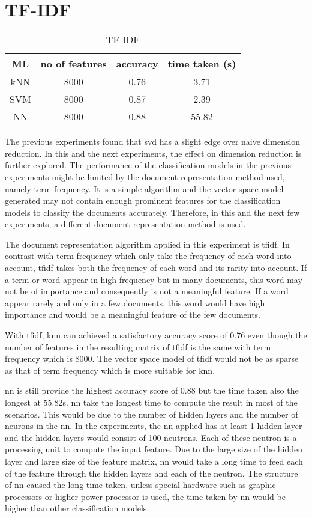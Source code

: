 \section{TF-IDF}
\begin{table} [H]
	\centering
	\caption{TF-IDF}
	\label{tbl:tfidf}
	\begin{tabular}{|| c | c | c | c||}
		\hline
		ML & no of features & accuracy & time taken (s) \\ [0.5ex]
		\hline\hline
		kNN & 8000 & 0.76 & 3.71 \\ 
		\hline
		SVM & 8000 & 0.87 & 2.39 \\
		\hline
		NN & 8000 & 0.88 & 55.82 \\
		\hline
	\end{tabular}
\end{table}

The previous experiments found that \ac{svd} has a slight edge over naive dimension reduction. In this and the next experiments, the effect on dimension reduction is further explored. The performance of the classification models in the previous experiments might be limited by the document representation method used, namely term frequency. It is a simple algorithm and the vector space model generated may not contain enough prominent features for the classification models to classify the documents accurately. Therefore, in this and the next few experiments, a different document representation method is used.
 
The document representation algorithm applied in this experiment is \ac{tfidf}. In contrast with term frequency which only take the frequency of each word into account, \ac{tfidf} takes both the frequency of each word and its rarity into account. If a term or word appear in high frequency but in many documents, this word may not be of importance and consequently is not a meaningful feature. If a word appear rarely and only in a few documents, this word would have high importance and would be a meaningful feature of the few documents.

With \ac{tfidf}, \ac{knn} can achieved a satisfactory accuracy score of 0.76 even though the number of features in the resulting matrix of \ac{tfidf} is the same with term frequency which is 8000. The vector space model of \ac{tfidf} would not be as sparse as that of term frequency which is more suitable for \ac{knn}.

\Ac{nn} is still provide the highest accuracy score of 0.88 but the time taken also the longest at 55.82s.
\Ac{nn} take the longest time to compute the result in most of the scenarios. This would be due to the number of hidden layers and the number of neurons in the \ac{nn}. In the experiments, the \ac{nn} applied has at least 1 hidden layer and the hidden layers would consist of 100 neutrons. Each of these neutron is a processing unit to compute the input feature. Due to the large size of the hidden layer and large size of the feature matrix, \ac{nn} would take a long time to feed each of the feature through the hidden layers and each of the neutron. The structure of \ac{nn} caused the long time taken, unless special hardware such as graphic processors or higher power processor is used, the time taken by \ac{nn} would be higher than other classification models.

